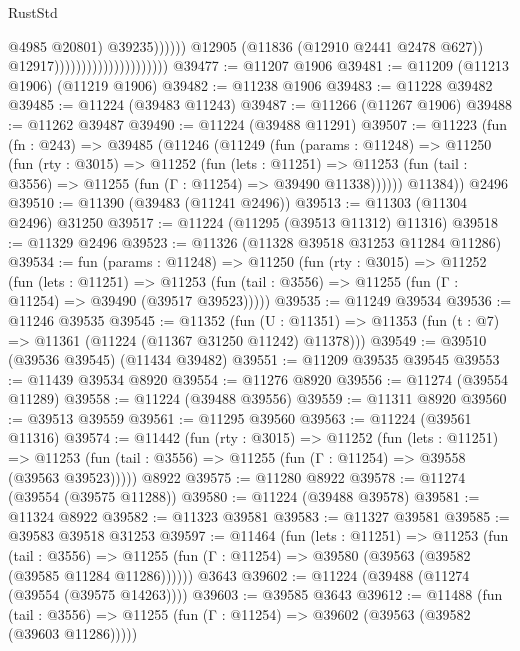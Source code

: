 \begin{lexlean}{RustStd}
\begin{coremodule}
                                                            @4985
                                                            @20801)
                                                          @39235))))))
                                              @12905
                                              (@11836 (@12910 @2441 @2478 @627))
                                              @12917)))))))))))))))))))))
@39477 := @11207 @1906
@39481 := @11209 (@11213 @1906) (@11219 @1906)
@39482 := @11238 @1906
@39483 := @11228 @39482
@39485 := @11224 (@39483 @11243)
@39487 := @11266 (@11267 @1906)
@39488 := @11262 @39487
@39490 := @11224 (@39488 @11291)
@39507 := @11223
    (fun (fn : @243) =>
    @39485
      (@11246
        (@11249
          (fun (params : @11248) =>
          @11250
            (fun (rty : @3015) =>
            @11252
              (fun (lets : @11251) =>
              @11253 (fun (tail : @3556) => @11255 (fun (Γ : @11254) => @39490 @11338))))))
        @11384))
    @2496
@39510 := @11390 (@39483 (@11241 @2496))
@39513 := @11303 (@11304 @2496) @31250
@39517 := @11224 (@11295 (@39513 @11312) @11316)
@39518 := @11329 @2496
@39523 := @11326 (@11328 @39518 @31253 @11284 @11286)
@39534 := fun (params : @11248) =>
  @11250
    (fun (rty : @3015) =>
    @11252
      (fun (lets : @11251) =>
      @11253 (fun (tail : @3556) => @11255 (fun (Γ : @11254) => @39490 (@39517 @39523)))))
@39535 := @11249 @39534
@39536 := @11246 @39535
@39545 := @11352
    (fun (U : @11351) => @11353 (fun (t : @7) => @11361 (@11224 (@11367 @31250 @11242) @11378)))
@39549 := @39510 (@39536 @39545) (@11434 @39482)
@39551 := @11209 @39535 @39545
@39553 := @11439 @39534 @8920
@39554 := @11276 @8920
@39556 := @11274 (@39554 @11289)
@39558 := @11224 (@39488 @39556)
@39559 := @11311 @8920
@39560 := @39513 @39559
@39561 := @11295 @39560
@39563 := @11224 (@39561 @11316)
@39574 := @11442
    (fun (rty : @3015) =>
    @11252
      (fun (lets : @11251) =>
      @11253 (fun (tail : @3556) => @11255 (fun (Γ : @11254) => @39558 (@39563 @39523)))))
    @8922
@39575 := @11280 @8922
@39578 := @11274 (@39554 (@39575 @11288))
@39580 := @11224 (@39488 @39578)
@39581 := @11324 @8922
@39582 := @11323 @39581
@39583 := @11327 @39581
@39585 := @39583 @39518 @31253
@39597 := @11464
    (fun (lets : @11251) =>
    @11253
      (fun (tail : @3556) =>
      @11255 (fun (Γ : @11254) => @39580 (@39563 (@39582 (@39585 @11284 @11286))))))
    @3643
@39602 := @11224 (@39488 (@11274 (@39554 (@39575 @14263))))
@39603 := @39585 @3643
@39612 := @11488
    (fun (tail : @3556) => @11255 (fun (Γ : @11254) => @39602 (@39563 (@39582 (@39603 @11286)))))

\end{coremodule}
\end{lexlean}
